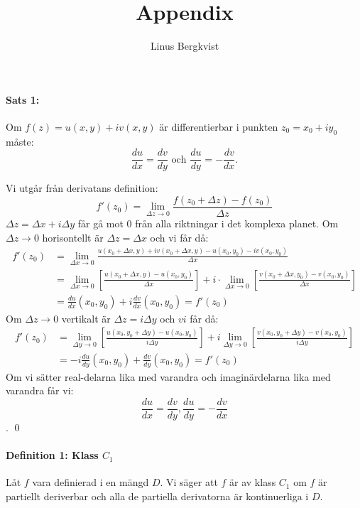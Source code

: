 \documentclass{article}
\begin{document}
\title{Appendix}
\author{Linus Bergkvist}
\date{}
\maketitle

\noindent

\paragraph{Sats 1:}
Om $f(z) = u(x, y) + iv(x, y)$ är differentierbar i punkten $z_0 = x_0 + iy_0$ måste:
$$\frac {d u} {d x} = \frac {d v} {d y} 
	\text{ och } \frac {d u} {d y} = - \frac {d v} {d x}.$$

Vi utgår från derivatans definition:
$$f'(z_0) = \lim_{\Delta z \to 0} \frac {f(z_0 + \Delta z) - f(z_0)} {\Delta z} $$
$\Delta z = \Delta x + i \Delta y$ får gå mot $0$ från alla riktningar i det komplexa planet.
Om $\Delta z \to 0$ horisontellt är $\Delta z = \Delta x$ och vi får då:
\begin{align*}
	f'(z_0) &=  \lim_{\Delta x \to 0} \frac {u(x_0 + \Delta x, y) + iv(x_0 + \Delta x, y) - u(x_0, y_0) - iv(x_0, y_0)} {\Delta x} \\
		&= \lim_{\Delta x \to 0} \left [ \frac {u(x_0 + \Delta x, y) - u(x_0, y_0)} {\Delta x} \right ] + i \cdot \lim_{\Delta x \to 0} \left [ \frac {v(x_0 + \Delta x, y_0) - v(x_0, y_0)} {\Delta x} \right ] \\
	&= \frac {d u} {d x} (x_0, y_0) + i \frac {d v} {d x} (x_0, y_0) = f'(z_0)
\end{align*}
Om $\Delta z \to 0$ vertikalt är $\Delta z = i \Delta y$ och $vi$ får då:
\begin{align*}
	f'(z_0) &= \lim_{\Delta y \to 0} \left [ \frac {u(x_0, y_0  + \Delta y) - u(x_0, y_0)} {i \Delta y} \right ] +
		i \lim_{\Delta y \to 0} \left [ \frac {v(x_0, y_0 + \Delta y) - v(x_0, y_0)} {i \Delta y} \right ] \\
	&= - i \frac {d u} {d y} (x_0, y_0) + \frac {d v} {d y} (x_0, y_0) = f'(z_0)
\end{align*}
Om vi sätter real-delarna lika med varandra och imaginärdelarna lika med varandra får vi:
$$\frac {d u} {d x} = \frac {d v} {d y}, \frac {d u} {d y} = -
	\frac {d v} {d x}$$.
\hfill \qed

\paragraph{Definition 1: Klass $C_1$}
Låt $f$ vara definierad i en mängd $D$. Vi säger att $f$ är av klass $C_1$ om $f$ är partiellt deriverbar och
alla de partiella derivatorna är kontinuerliga i $D$.\\
\\
\end{document}
